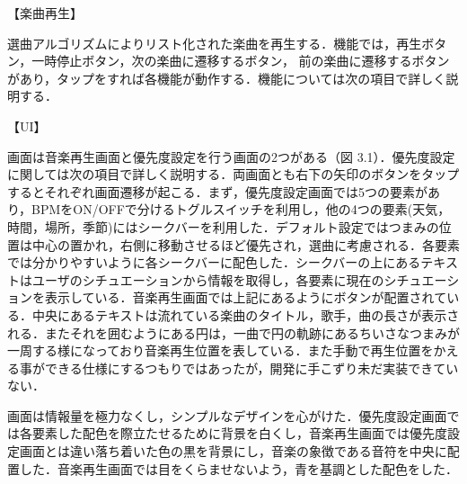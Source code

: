 【楽曲再生】
\par
選曲アルゴリズムによりリスト化された楽曲を再生する．機能では，再生ボタン，一時停止ボタン，次の楽曲に遷移するボタン，
前の楽曲に遷移するボタンがあり，タップをすれば各機能が動作する．機能については次の項目で詳しく説明する．
\par
【UI】
\par
画面は音楽再生画面と優先度設定を行う画面の2つがある（図 3.1）．優先度設定に関しては次の項目で詳しく説明する．両画面とも右下の矢印のボタンをタップするとそれぞれ画面遷移が起こる．まず，優先度設定画面では5つの要素があり，BPMをON/OFFで分けるトグルスイッチを利用し，他の4つの要素(天気，時間，場所，季節)にはシークバーを利用した．デフォルト設定ではつまみの位置は中心の置かれ，右側に移動させるほど優先され，選曲に考慮される．各要素では分かりやすいように各シークバーに配色した．シークバーの上にあるテキストはユーザのシチュエーションから情報を取得し，各要素に現在のシチュエーションを表示している．音楽再生画面では上記にあるようにボタンが配置されている．中央にあるテキストは流れている楽曲のタイトル，歌手，曲の長さが表示される．またそれを囲むようにある円は，一曲で円の軌跡にあるちいさなつまみが一周する様になっており音楽再生位置を表している．また手動で再生位置をかえる事ができる仕様にするつもりではあったが，開発に手こずり未だ実装できていない．
\par
画面は情報量を極力なくし，シンプルなデザインを心がけた．優先度設定画面では各要素した配色を際立たせるために背景を白くし，音楽再生画面では優先度設定画面とは違い落ち着いた色の黒を背景にし，音楽の象徴である音符を中央に配置した．音楽再生画面では目をくらませないよう，青を基調とした配色をした．

